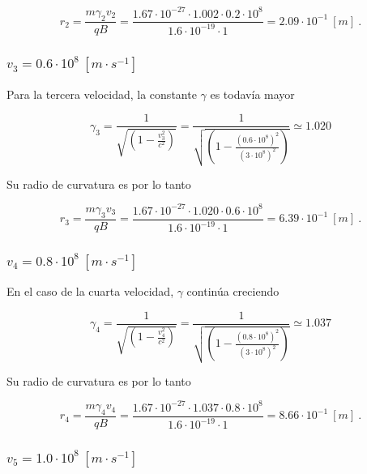 \documentclass[journal]{IEEEtran}
\begin{document}
\begin{equation}
r_2 = \displaystyle\frac{m\gamma_2v_2}{qB} = \displaystyle\frac{1.67\cdot 10^{-27}\cdot 1.002 \cdot 0.2\cdot 10^8}{1.6\cdot 10^{-19}\cdot 1} = 2.09\cdot 10^{-1}~[m]~.
\end{equation}

\subsubsection{$v_3 = 0.6\cdot 10^8~[m\cdot s^{-1}]$}

Para la tercera velocidad, la constante $\gamma$ es todavía mayor

\begin{equation}
\gamma_3 = \displaystyle\frac{1}{\sqrt{(1-\displaystyle\frac{v_3^2}{c^2})}} = \displaystyle\frac{1}{\sqrt{(1-\displaystyle\frac{(0.6\cdot 10^8)^2}{(3\cdot 10^8)^2})}} \simeq 1.020
\end{equation}

Su radio de curvatura es por lo tanto

\begin{equation}
r_3 = \displaystyle\frac{m\gamma_3v_3}{qB} = \displaystyle\frac{1.67\cdot 10^{-27}\cdot 1.020 \cdot 0.6\cdot 10^8}{1.6\cdot 10^{-19}\cdot 1} = 6.39\cdot 10^{-1}~[m]~.
\end{equation}

\subsubsection{$v_4 = 0.8\cdot 10^8~[m\cdot s^{-1}]$}

En el caso de la cuarta velocidad, $\gamma$ continúa creciendo

\begin{equation}
\gamma_4 = \displaystyle\frac{1}{\sqrt{(1-\displaystyle\frac{v_4^2}{c^2})}} = \displaystyle\frac{1}{\sqrt{(1-\displaystyle\frac{(0.8\cdot 10^8)^2}{(3\cdot 10^8)^2})}} \simeq 1.037
\end{equation}

Su radio de curvatura es por lo tanto

\begin{equation}
r_4 = \displaystyle\frac{m\gamma_4v_4}{qB} = \displaystyle\frac{1.67\cdot 10^{-27}\cdot 1.037 \cdot 0.8\cdot 10^8}{1.6\cdot 10^{-19}\cdot 1} = 8.66\cdot 10^{-1}~[m]~.
\end{equation}

\subsubsection{$v_5 = 1.0\cdot 10^8~[m\cdot s^{-1}]$}
\end{document}
